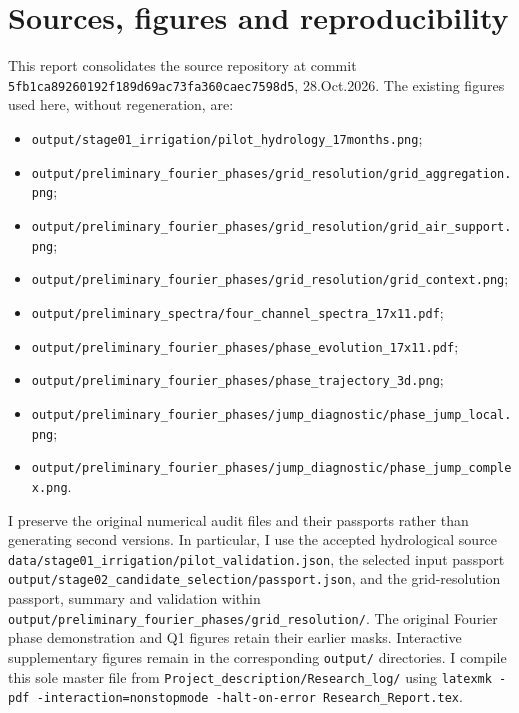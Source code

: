 \documentclass[11pt,letterpaper]{article}
\begin{document}
\section*{Sources, figures and reproducibility}
This report consolidates the source repository at commit \texttt{5fb1ca89260192f189d69ac73fa360caec7598d5}, 28.Oct.2026. The existing figures used here, without regeneration, are:
\begin{itemize}
\item \texttt{output/stage01\_irrigation/pilot\_hydrology\_17months.png};
\item \texttt{output/preliminary\_fourier\_phases/grid\_resolution/grid\_aggregation.png};
\item \texttt{output/preliminary\_fourier\_phases/grid\_resolution/grid\_air\_support.png};
\item \texttt{output/preliminary\_fourier\_phases/grid\_resolution/grid\_context.png};
\item \texttt{output/preliminary\_spectra/four\_channel\_spectra\_17x11.pdf};
\item \texttt{output/preliminary\_fourier\_phases/phase\_evolution\_17x11.pdf};
\item \texttt{output/preliminary\_fourier\_phases/phase\_trajectory\_3d.png};
\item \texttt{output/preliminary\_fourier\_phases/jump\_diagnostic/phase\_jump\_local.png};
\item \texttt{output/preliminary\_fourier\_phases/jump\_diagnostic/phase\_jump\_complex.png}.
\end{itemize}
I preserve the original numerical audit files and their
passports rather than generating second versions. In particular,
I use the accepted hydrological source
\texttt{data/stage01\_irrigation/pilot\_validation.json},
the selected input passport
\texttt{output/stage02\_candidate\_selection/passport.json},
and the grid-resolution passport, summary and validation
within \texttt{output/preliminary\_fourier\_phases/grid\_resolution/}.
The original Fourier phase demonstration and Q1 figures
retain their earlier masks. Interactive supplementary
figures remain in the corresponding \texttt{output/}
directories. I compile this sole master file from
\texttt{Project\_description/Research\_log/} using
\texttt{latexmk -pdf -interaction=nonstopmode -halt-on-error Research\_Report.tex}.
\end{document}
